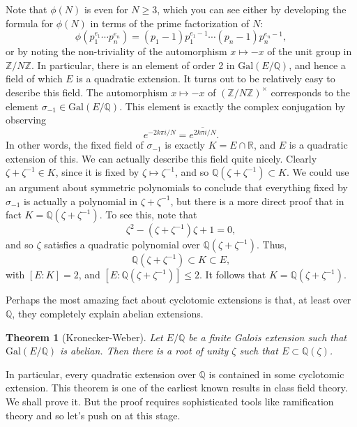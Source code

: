 \documentclass[12pt]{report}
\newtheorem{theorem}{Theorem}[section]
\theoremstyle{definition}
\newcommand{\Gal}{\text{Gal}}
\newcommand{\ZZ}{\mathbb{Z}}
\newcommand{\QQ}{\mathbb{Q}}
\newcommand{\RR}{\mathbb{R}}
\begin{document}
Note that $\phi(N)$ is even for $N \geq 3$, which you can see either by developing the formula for $\phi(N)$ in terms of the prime factorization of $N$:
$$\phi(p_1^{e_1}\cdots p_n^{e_n}) = (p_1-1)p_1^{e_1-1}\cdots (p_n-1) p_n^{e_n-1},$$
or by noting the non-triviality of the automorphism $x \mapsto -x$ of the unit group in $\ZZ/N\ZZ$. In particular, there is an element of order 2 in $\Gal(E/\QQ)$, and hence a field of which $E$ is a quadratic extension. It turns out to be relatively easy to describe this field. The automorphism $x \mapsto -x$ of $(\ZZ/N\ZZ)^\times$ corresponds to the element $\sigma_{-1}\in \Gal(E/\QQ)$. This element is exactly the complex conjugation by observing $$e^{-2k\pi i/N} =\overline{e^{2k\pi i /N}}.$$
In other words, the fixed field of $\sigma_{-1}$ is exactly $K = E\cap \RR$, and $E$ is a quadratic extension of this. We can actually describe this field quite nicely. Clearly $\zeta + \zeta^{-1} \in K$, since it is fixed by $\zeta \mapsto \zeta^{-1}$, and so $\QQ(\zeta + \zeta^{-1}) \subset K$. We could use an argument about symmetric polynomials to conclude that everything fixed by $\sigma_{-1}$ is actually a polynomial in $\zeta + \zeta^{-1}$, but there is a more direct proof that in fact $K = \QQ(\zeta + \zeta^{-1})$. To see this, note that
$$\zeta^2 - (\zeta + \zeta^{-1})\zeta + 1 = 0,$$
and so $\zeta$ satisfies a quadratic polynomial over $\QQ(\zeta + \zeta^{-1})$. Thus, $$\QQ(\zeta + \zeta^{-1}) \subset K \subset E,$$
with $[E : K] = 2$, and $[E : \QQ(\zeta + \zeta^{-1})] \leq 2$. It follows that $K = \QQ(\zeta + \zeta^{-1})$.

Perhaps the most amazing fact about cyclotomic extensions is that, at least over $\QQ$, they completely explain abelian extensions.

\begin{theorem}[Kronecker-Weber]
	Let $E/\QQ$ be a finite Galois extension such that $\Gal(E/\QQ)$ is abelian. Then there is a root of unity $\zeta$ such that $E \subset \QQ(\zeta)$.
\end{theorem}

In particular, every quadratic extension over $\QQ$ is contained in some cyclotomic extension. This theorem is one of the earliest known results in class field theory. We shall prove it. But the proof requires sophisticated tools like ramification theory and so let's push on at this stage.
\end{document}
